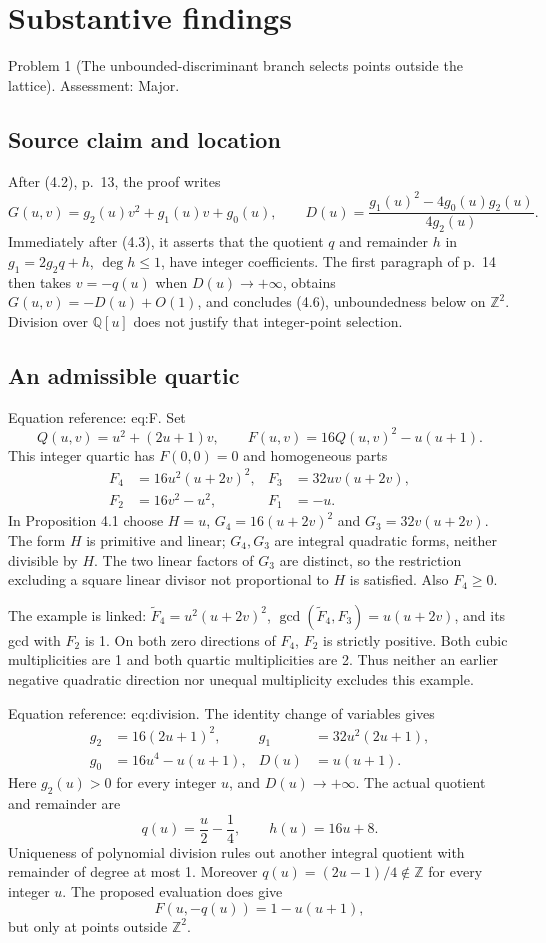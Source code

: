 \documentclass[10pt]{article}
\begin{document}
\section*{Substantive findings}
Problem 1 (The unbounded-discriminant branch selects points outside the lattice).  Assessment: Major.\par
\subsection*{Source claim and location}
After (4.2), p. 13, the proof writes \[G(u,v)=g_2(u)v^2+g_1(u)v+g_0(u),\qquad
 D(u)=\frac{g_1(u)^2-4g_0(u)g_2(u)}{4g_2(u)}.\] Immediately after (4.3), it asserts that the quotient \(q\) and remainder \(h\) in \(g_1=2g_2q+h\), \(\deg h\leq1\), have integer coefficients. The first paragraph of p. 14 then takes \(v=-q(u)\) when \(D(u)\to+\infty\), obtains \(G(u,v)=-D(u)+O(1)\), and concludes (4.6), unboundedness below on \(\mathbb Z^2\). Division over \(\mathbb Q[u]\) does not justify that integer-point selection.\par
\subsection*{An admissible quartic}
Equation reference: eq:F. Set \[
 Q(u,v)=u^2+(2u+1)v,\qquad F(u,v)=16Q(u,v)^2-u(u+1).\] This integer quartic has \(F(0,0)=0\) and homogeneous parts \[\begin{aligned}
 F_4&=16u^2(u+2v)^2,&F_3&=32uv(u+2v),\\
 F_2&=16v^2-u^2,&F_1&=-u.
 \end{aligned}\] In Proposition 4.1 choose \(H=u\), \(G_4=16(u+2v)^2\) and \(G_3=32v(u+2v)\). The form \(H\) is primitive and linear; \(G_4,G_3\) are integral quadratic forms, neither divisible by \(H\). The two linear factors of \(G_3\) are distinct, so the restriction excluding a square linear divisor not proportional to \(H\) is satisfied. Also \(F_4\geq0\).\par
The example is linked: \(\widetilde F_4=u^2(u+2v)^2\), \(\gcd(\widetilde F_4,F_3)=u(u+2v)\), and its gcd with \(F_2\) is 1. On both zero directions of \(F_4\), \(F_2\) is strictly positive. Both cubic multiplicities are 1 and both quartic multiplicities are 2. Thus neither an earlier negative quadratic direction nor unequal multiplicity excludes this example.\par
Equation reference: eq:division. The identity change of variables gives \[\begin{aligned}
 g_2&=16(2u+1)^2,&g_1&=32u^2(2u+1),\\
 g_0&=16u^4-u(u+1),&D(u)&=u(u+1).
 \end{aligned}\] Here \(g_2(u)>0\) for every integer \(u\), and \(D(u)\to+\infty\). The actual quotient and remainder are \[
 q(u)=\frac u2-\frac14,\qquad h(u)=16u+8.\] Uniqueness of polynomial division rules out another integral quotient with remainder of degree at most 1. Moreover \(q(u)=(2u-1)/4\notin\mathbb Z\) for every integer \(u\). The proposed evaluation does give \[F(u,-q(u))=1-u(u+1),\] but only at points outside \(\mathbb Z^2\).\par
\end{document}
